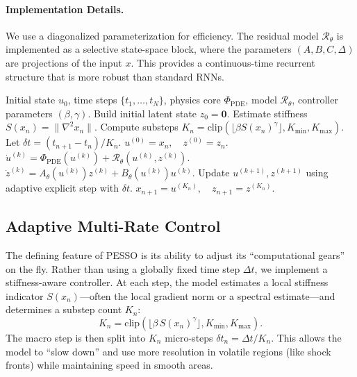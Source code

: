 \documentclass{article}
\theoremstyle{plain}
\theoremstyle{definition}
\theoremstyle{remark}
\begin{document}
\paragraph{Implementation Details.}
We use a diagonalized parameterization for efficiency. The residual model $\mathcal{R}_\theta$ is implemented as a selective state-space block, where the parameters $(A, B, C, \Delta)$ are projections of the input $x$. This provides a continuous-time recurrent structure that is more robust than standard RNNs.

\begin{algorithm}[tb]
   \caption{PESSO Rollout}
   \label{alg:pesso}
\begin{algorithmic}[1]
    Initial state $u_0$, time steps $\{t_1, \dots, t_N\}$, physics core $\Phi_{\text{PDE}}$, model $\mathcal{R}_\theta$, controller parameters $(\beta, \gamma)$.
   \STATE Build initial latent state $z_0 = \mathbf{0}$.
   \STATE Estimate stiffness $S(x_n) = \|\nabla^2 x_n\|$.
   \STATE Compute substeps $K_n = \mathrm{clip}(\lfloor \beta S(x_n)^\gamma \rfloor, K_{\min}, K_{\max})$.
   \STATE Let $\delta t = (t_{n+1} - t_n) / K_n$.
   \STATE $u^{(0)} = x_n, \quad z^{(0)} = z_n$.
   \STATE $\dot{u}^{(k)} = \Phi_{\text{PDE}}(u^{(k)}) + \mathcal{R}_\theta(u^{(k)}, z^{(k)})$.
   \STATE $\dot{z}^{(k)} = A_\theta(u^{(k)}) z^{(k)} + B_\theta(u^{(k)}) u^{(k)}$.
   \STATE Update $u^{(k+1)}, z^{(k+1)}$ using adaptive explicit step with $\delta t$.
   \ENDFOR
   \STATE $x_{n+1} = u^{(K_n)}, \quad z_{n+1} = z^{(K_n)}$.
   \ENDFOR
\end{algorithmic}
\end{algorithm}

\subsection{Adaptive Multi-Rate Control}

The defining feature of PESSO is its ability to adjust its ``computational gears'' on the fly. Rather than using a globally fixed time step $\Delta t$, we implement a stiffness-aware controller. At each step, the model estimates a local stiffness indicator $S(x_n)$—often the local gradient norm or a spectral estimate—and determines a substep count $K_n$:
\begin{equation}
   K_n = \mathrm{clip}\left( \lfloor \beta \, S(x_n)^\gamma \rfloor, K_{\min}, K_{\max} \right).
\end{equation}
The macro step is then split into $K_n$ micro-steps $\delta t_n = \Delta t/K_n$. This allows the model to ``slow down'' and use more resolution in volatile regions (like shock fronts) while maintaining speed in smooth areas.
\end{document}
